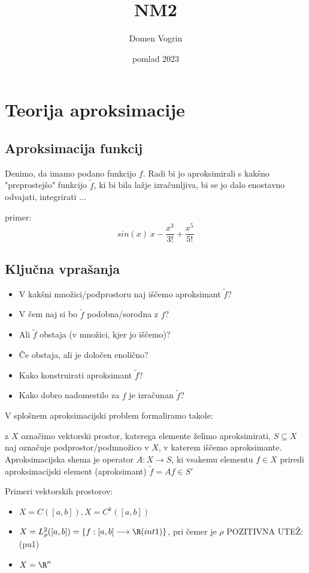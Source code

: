 \documentclass{article}
\title{NM2}
\author{Domen Vogrin}
\date{pomlad 2023}
\begin{document}
\maketitle

\section{Teorija aproksimacije}

\subsection{Aproksimacija funkcij}
Denimo, da imamo podano funkcijo $f$. Radi bi jo aproksimirali s kakšno "preprostejšo" funkcijo $\tilde{f}$, ki bi bila lažje izračunljiva, bi se jo dalo enostavno odvajati, integrirati ...

primer:
\begin{equation}
    sin(x) ~ x - \frac{x^3}{3!} + \frac{x^5}{5!}
\end{equation}

\subsection{Ključna vprašanja}
\begin{itemize}
    \item V kakšni množici/podprostoru naj iščemo aproksimant $\tilde{f}$?
    \item V čem naj si bo $\tilde{f}$ podobna/sorodna z $f$?
    \item Ali $\tilde{f}$ obstaja (v množici, kjer jo iščemo)?
    \item Če obstaja, ali je določen enolično?
    \item Kako konstruirati aproksimant $\tilde{f}$?
    \item Kako dobro nadomestilo za $f$ je izračunan $\tilde{f}$?
\end{itemize}

V splošnem aproksimacijski problem formaliramo takole:

z $X$ označimo vektorski prostor, katerega elemente želimo aproksimirati, $S 	\subseteq X$ naj označuje podprostor/podmnožico v $X$, v katerem iščemo aproksimante. Aproksimacijska shema je operator $A: X \longrightarrow S$, ki vsakemu elementu $f \in X$ priredi aproksimacijski element (aproksimant) $\tilde{f} = A f \in S'$

Primeri vektorskih prostorov:
\begin{itemize}
    \item $X = C([a, b]), X = C^k([a, b])$
    \item $X = L^{2}_{\rho}([a, b]) = \{f: [a, b] \longrightarrow \R (int1)\}$, pri čemer je $\rho$ POZITIVNA UTEŽ: (pu1)
    \item $X = \R ^n$
\end{itemize}
\end{document}

